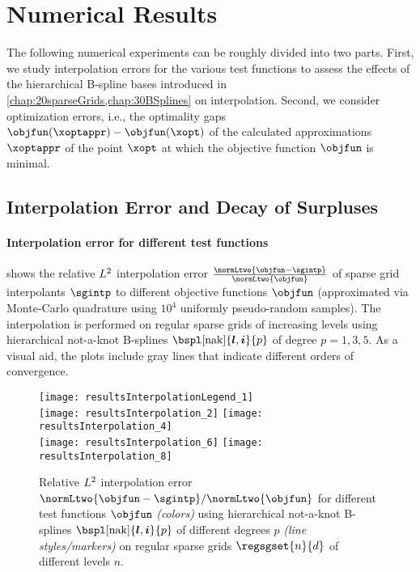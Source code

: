 \section{Numerical Results}
\label{sec:54results}

The following numerical experiments can be roughly divided into two parts.
First, we study interpolation errors for the various test functions
to assess the effects of the hierarchical B-spline bases introduced in
\cref{chap:20sparseGrids,chap:30BSplines} on interpolation.
Second, we consider optimization errors, i.e.,
the optimality gaps $\objfun(\xoptappr) - \objfun(\xopt)$
of the calculated approximations $\xoptappr$
of the point $\xopt$ at which the objective function $\objfun$
is minimal.



\subsection{Interpolation Error and Decay of Surpluses}
\label{sec:541interpolation}

\paragraph{Interpolation error for different test functions}

 shows the
relative $L^2$ interpolation error
$\tfrac{\normLtwo{\objfun - \sgintp}}{\normLtwo{\objfun}}$
of sparse grid interpolants $\sgintp$ to
different objective functions $\objfun$
(approximated via Monte-Carlo quadrature using
$10^4$ uniformly pseudo-random samples).
The interpolation is performed on regular sparse grids of increasing levels
using hierarchical not-a-knot B-splines $\bspl[\nak]{\*l,\*i}{p}$
of degree $p = 1, 3, 5$.
As a visual aid, the plots include gray lines that indicate different
orders of convergence.

\begin{figure}
  \texttt{[image: resultsInterpolationLegend\_1]}\\[2mm]%
  \texttt{[image: resultsInterpolation\_2]}%
  \hfill%
  \texttt{[image: resultsInterpolation\_4]}%
  \\[2mm]%
  \texttt{[image: resultsInterpolation\_6]}%
  \hfill%
  \texttt{[image: resultsInterpolation\_8]}%
  \caption[Relative interpolation error for different test functions]{%
    Relative $L^2$ interpolation error
    $\normLtwo{\objfun - \sgintp}/\normLtwo{\objfun}$
    for different test functions $\objfun$ \emph{(colors)}
    using hierarchical not-a-knot B-splines
    $\bspl[\nak]{\*l,\*i}{p}$ of different degrees $p$
    \emph{(line styles/markers)} on
    regular sparse grids $\regsgset{n}{d}$ of different levels $n$.%
  }%
  \label{fig:resultsInterpolationErrorTestFunctions}%
\end{figure}

